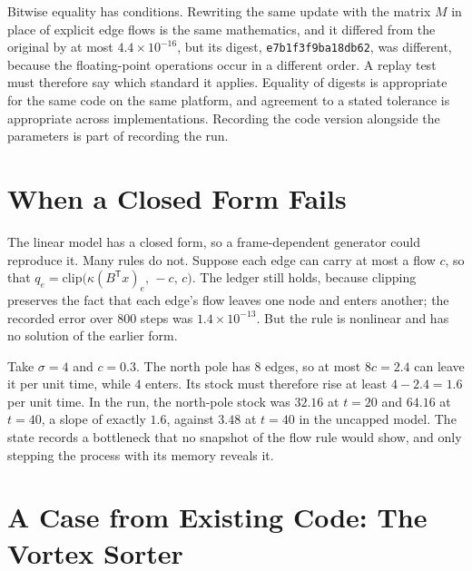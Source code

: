 Bitwise equality has conditions. Rewriting the same update with the matrix $M$ in place of explicit edge flows is the same mathematics, and it differed from the original by at most $4.4\times10^{-16}$, but its digest, \texttt{e7b1f3f9ba18db62}, was different, because the floating-point operations occur in a different order. A replay test must therefore say which standard it applies. Equality of digests is appropriate for the same code on the same platform, and agreement to a stated tolerance is appropriate across implementations. Recording the code version alongside the parameters is part of recording the run.

\section{When a Closed Form Fails}

The linear model has a closed form, so a frame-dependent generator could reproduce it. Many rules do not. Suppose each edge can carry at most a flow $c$, so that $q_e=\mathrm{clip}\bigl(\kappa(B^{\mathsf T}x)_e,\,-c,\,c\bigr)$. The ledger still holds, because clipping preserves the fact that each edge's flow leaves one node and enters another; the recorded error over $800$ steps was $1.4\times10^{-13}$. But the rule is nonlinear and has no solution of the earlier form.

Take $\sigma=4$ and $c=0.3$. The north pole has $8$ edges, so at most $8c=2.4$ can leave it per unit time, while $4$ enters. Its stock must therefore rise at least $4-2.4=1.6$ per unit time. In the run, the north-pole stock was $32.16$ at $t=20$ and $64.16$ at $t=40$, a slope of exactly $1.6$, against $3.48$ at $t=40$ in the uncapped model. The state records a bottleneck that no snapshot of the flow rule would show, and only stepping the process with its memory reveals it.

\section{A Case from Existing Code: The Vortex Sorter}

